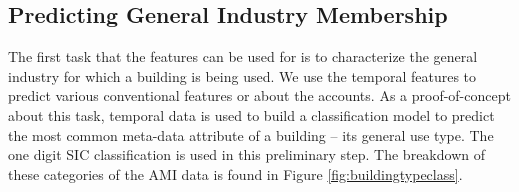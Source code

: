 \subsection{Predicting General Industry Membership}
\label{sec:predictinsiccode}

The first task that the features can be used for is to characterize the general industry for which a building is being used. We use the temporal features to predict various conventional features or about the accounts. As a proof-of-concept about this task, temporal data is used to build a classification model to predict the most common meta-data attribute of a building – its general use type. The one digit SIC classification is used in this preliminary step. The breakdown of these categories of the AMI data is found in Figure \ref{fig:buildingtypeclass}.




